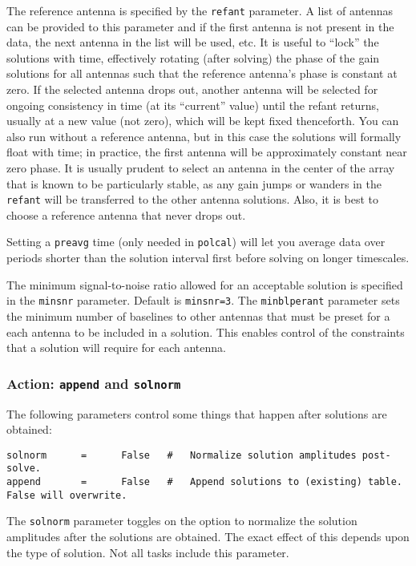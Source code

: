 {The reference antenna is specified by the {\tt refant} parameter. A
list of antennas can be provided to this parameter and if the first
antenna is not present in the data, the next antenna in the list will
be used, etc.  It is useful to ``lock'' the solutions with time,
effectively rotating (after solving) the phase of the gain solutions
for all antennas such that the reference antenna's phase is constant
at zero.  If the selected antenna drops out, another antenna will be
selected for ongoing consistency in time (at its ``current'' value)
until the refant returns, usually at a new value (not zero), which
will be kept fixed thenceforth.  You can also run without a reference
antenna, but in this case the solutions will formally float with time;
in practice, the first antenna will be approximately constant near
zero phase.  It is usually prudent to select an antenna in the center
of the array that is known to be particularly stable, as any gain
jumps or wanders in the {\tt refant} will be transferred to the other
antenna solutions.  Also, it is best to choose a reference antenna
that never drops out.



Setting a {\tt preavg} time (only needed in {\tt polcal}) will let you
average data over periods shorter than the solution interval first
before solving on longer timescales.

The minimum signal-to-noise ratio allowed for an acceptable solution
is specified in the {\tt minsnr} parameter.  Default is {\tt minsnr=3}.
The {\tt minblperant} parameter sets the minimum number of baselines
to other antennas that must be preset for a each antenna to be
included in a solution.  This enables control of the constraints
that a solution will require for each antenna.

\subsubsection{Action: {\tt append} and {\tt solnorm} }
\label{section:cal.solve.pars.action}

The following parameters control some things that happen after
solutions are obtained:
\small
\begin{verbatim}
solnorm      =      False   #   Normalize solution amplitudes post-solve.
append       =      False   #   Append solutions to (existing) table.  False will overwrite.
\end{verbatim} 
\normalsize

The {\tt solnorm} parameter toggles on the option to normalize the
solution amplitudes after the solutions are obtained.  The exact
effect of this depends upon the type of solution.  Not all tasks
include this parameter.  

}
